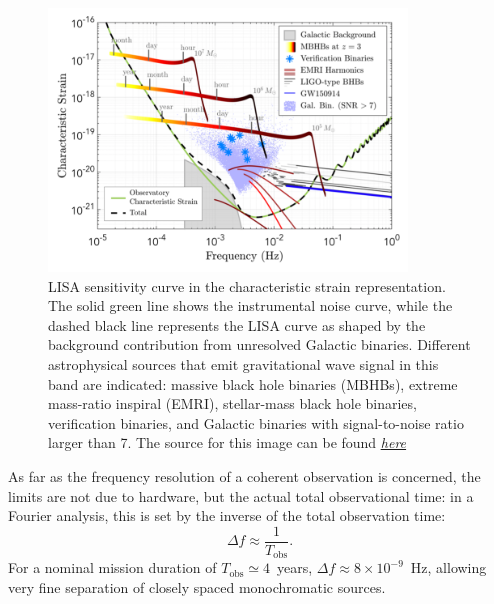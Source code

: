 \begin{figure}
    \begin{center}
        \includegraphics[width=0.85\textwidth]{images/lisa_sensitivity_with_noises.png}
    \end{center}
    \caption{LISA sensitivity curve in the characteristic strain representation.
    The solid green line shows the instrumental noise curve, while the dashed black line represents the LISA curve as shaped by the background contribution from unresolved Galactic binaries.
    Different astrophysical sources that emit gravitational wave signal in this band are indicated: massive black hole binaries (MBHBs), extreme mass-ratio inspiral (EMRI), stellar-mass black hole binaries, verification binaries, and Galactic binaries with signal-to-noise ratio larger than 7.
The source for this image can be found \underline{\textit{\href{https://ar5iv.labs.arxiv.org/html/1803.01944}{here}}}}\label{fig: LISA sens curve with noises}
\end{figure}
As far as the frequency resolution of a coherent observation is concerned, the limits are not due to hardware, but the actual total observational time: in a Fourier analysis, this is set by the inverse of the total observation time:  
\begin{equation}
\Delta f \approx \frac{1}{T_{\mathrm{obs}}}.
\end{equation}
For a nominal mission duration of $T_{\mathrm{obs}} \simeq 4$~years, $\Delta f \approx 8\times 10^{-9}$~Hz, allowing very fine separation of closely spaced monochromatic sources.

